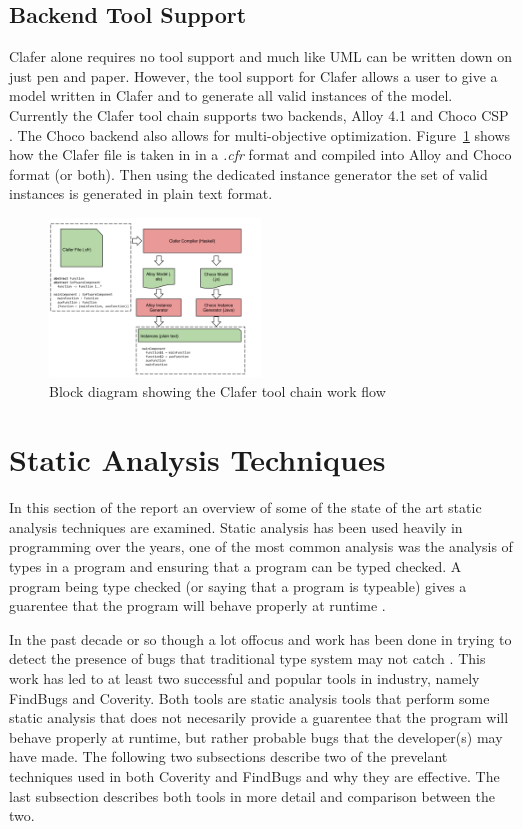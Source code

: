 \documentclass[10pt,oneside]{IEEEtran}
\begin{document}
\subsection{Backend Tool Support}
Clafer alone requires no tool support and much like UML can be written down on just pen and paper.
However, the tool support for Clafer allows a user to give a model written in Clafer and to generate
all valid instances of the model. Currently the Clafer tool chain supports two backends, Alloy 4.1
\cite{4} and Choco CSP \cite{3}. The Choco backend also allows for
multi-objective optimization. Figure~\ref{fig:claferToolChain} shows how the Clafer file is taken in in a \textit{.cfr} format and compiled into Alloy and Choco format (or both). Then using the dedicated instance generator the set of valid instances is generated in plain text format.
\begin{figure}[h]
  \label{fig:claferToolChain}
  \caption{Block diagram showing the Clafer tool chain work flow}
  \centering
  \includegraphics[width=0.5\textwidth]{ClaferToolChainWorkFlow}
\end{figure}

\section{Static Analysis Techniques}
In this section of the report an overview of some of the state of the art static analysis techniques
are examined. Static analysis has been used heavily in programming over the years, one of the most
common analysis was the analysis of types in a program and ensuring that a program can be typed checked.
A program being type checked (or saying that a program is typeable) gives a guarentee that the program
will behave properly at runtime \cite{2}.

In the past decade or so though a lot offocus and work has been done in trying to detect the presence of bugs that traditional type system may not catch \cite{8}. This work has led to at least two successful and popular tools in industry, namely FindBugs and Coverity. Both tools are static analysis tools that perform some static analysis that does not necesarily provide a guarentee that the program will behave properly at runtime, but rather probable bugs that the developer(s) may have made. The following two subsections describe two of the prevelant techniques used in both Coverity and FindBugs and why they are effective. The last subsection describes both tools in more detail and comparison between the two.
\end{document}
